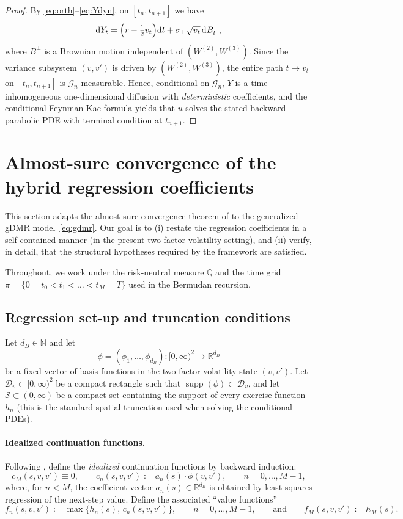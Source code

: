 \documentclass[10pt]{article}
\theoremstyle{plain}
\theoremstyle{definition}
\theoremstyle{remark}
\newcommand{\dd}{\mathrm d}
\DeclareMathOperator{\supp}{supp}
\begin{document}
\begin{proof}
By \eqref{eq:orth}--\eqref{eq:Ydyn}, on $[t_n,t_{n+1}]$ we have
\[
\dd Y_t=\Bigl(r-\tfrac12 v_t\Bigr)\dd t+\sigma_\perp\sqrt{v_t}\,\dd B^\perp_t,
\]
where $B^\perp$ is a Brownian motion independent of $(W^{(2)},W^{(3)})$.
Since the variance subsystem $(v,v')$ is driven by $(W^{(2)},W^{(3)})$, the entire path
$t\mapsto v_t$ on $[t_n,t_{n+1}]$ is $\mathcal G_n$-measurable. Hence, conditional on $\mathcal G_n$,
$Y$ is a time-inhomogeneous one-dimensional diffusion with \emph{deterministic} coefficients, and the
conditional Feynman-Kac formula yields that $u$ solves the stated backward parabolic PDE with terminal
condition at $t_{n+1}$.
\end{proof}


\section{Almost-sure convergence of the hybrid regression coefficients}
\label{sec:as_convergence}

This section adapts the almost-sure convergence theorem of \citet{farahany2020mixing}
to the generalized gDMR model~\eqref{eq:gdmr}. Our goal is to (i) restate the regression coefficients
in a self-contained manner (in the present two-factor volatility setting), and (ii) verify, in detail,
that the structural hypotheses required by the \citet{farahany2020mixing} framework are satisfied.

Throughout, we work under the risk-neutral measure $\mathbb{Q}$ and the time grid
$\pi=\{0=t_0<t_1<\dots<t_M=T\}$ used in the Bermudan recursion.

\subsection{Regression set-up and truncation conditions}
\label{subsec:regression_truncation}

Let $d_B\in\mathbb{N}$ and let
\[
\phi = (\phi_1,\dots,\phi_{d_B}) : [0,\infty)^2 \to \mathbb{R}^{d_B}
\]
be a fixed vector of basis functions in the two-factor volatility state $(v,v')$.
Let $\mathcal{D}_v\subset [0,\infty)^2$ be a compact rectangle such that $\supp(\phi)\subset \mathcal{D}_v$,
and let $\mathcal{S}\subset (0,\infty)$ be a compact set containing the support of every exercise function
$h_n$ (this is the standard spatial truncation used when solving the conditional PDEs).

\paragraph{Idealized continuation functions.}
Following \citet{farahany2020mixing}, define the \emph{idealized} continuation functions by backward
induction:
\[
c_M(s,v,v') \equiv 0,\qquad
c_n(s,v,v') := a_n(s)\cdot \phi(v,v'),\qquad n=0,\dots,M-1,
\]
where, for $n<M$, the coefficient vector $a_n(s)\in\mathbb{R}^{d_B}$ is obtained by least-squares regression
of the next-step value.
Define the associated ``value functions''
\[
f_n(s,v,v') := \max\{h_n(s),\,c_n(s,v,v')\},\qquad n=0,\dots,M-1,
\qquad\text{and}\qquad
f_M(s,v,v') := h_M(s).
\]
\end{document}

